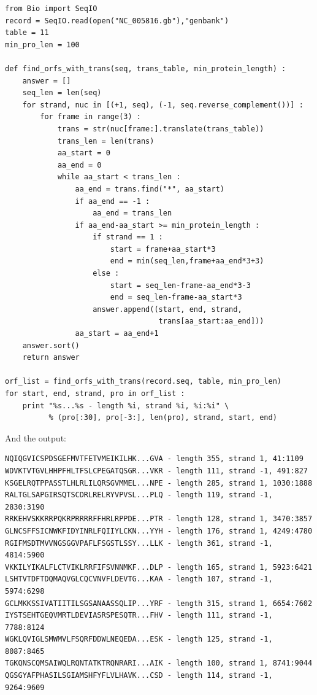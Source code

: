 \documentclass{report}
\begin{document}
\begin{verbatim}
from Bio import SeqIO 
record = SeqIO.read(open("NC_005816.gb"),"genbank")
table = 11
min_pro_len = 100

def find_orfs_with_trans(seq, trans_table, min_protein_length) :
    answer = []
    seq_len = len(seq)
    for strand, nuc in [(+1, seq), (-1, seq.reverse_complement())] :
        for frame in range(3) :
            trans = str(nuc[frame:].translate(trans_table))
            trans_len = len(trans)
            aa_start = 0
            aa_end = 0
            while aa_start < trans_len :
                aa_end = trans.find("*", aa_start)
                if aa_end == -1 :
                    aa_end = trans_len
                if aa_end-aa_start >= min_protein_length :
                    if strand == 1 :
                        start = frame+aa_start*3
                        end = min(seq_len,frame+aa_end*3+3)
                    else :
                        start = seq_len-frame-aa_end*3-3
                        end = seq_len-frame-aa_start*3                        
                    answer.append((start, end, strand,
                                   trans[aa_start:aa_end]))
                aa_start = aa_end+1
    answer.sort()
    return answer

orf_list = find_orfs_with_trans(record.seq, table, min_pro_len)
for start, end, strand, pro in orf_list :
    print "%s...%s - length %i, strand %i, %i:%i" \
          % (pro[:30], pro[-3:], len(pro), strand, start, end)
\end{verbatim}

\noindent And the output:

\begin{verbatim}
NQIQGVICSPDSGEFMVTFETVMEIKILHK...GVA - length 355, strand 1, 41:1109
WDVKTVTGVLHHPFHLTFSLCPEGATQSGR...VKR - length 111, strand -1, 491:827
KSGELRQTPPASSTLHLRLILQRSGVMMEL...NPE - length 285, strand 1, 1030:1888
RALTGLSAPGIRSQTSCDRLRELRYVPVSL...PLQ - length 119, strand -1, 2830:3190
RRKEHVSKKRRPQKRPRRRRFFHRLRPPDE...PTR - length 128, strand 1, 3470:3857
GLNCSFFSICNWKFIDYINRLFQIIYLCKN...YYH - length 176, strand 1, 4249:4780
RGIFMSDTMVVNGSGGVPAFLFSGSTLSSY...LLK - length 361, strand -1, 4814:5900
VKKILYIKALFLCTVIKLRRFIFSVNNMKF...DLP - length 165, strand 1, 5923:6421
LSHTVTDFTDQMAQVGLCQCVNVFLDEVTG...KAA - length 107, strand -1, 5974:6298
GCLMKKSSIVATIITILSGSANAASSQLIP...YRF - length 315, strand 1, 6654:7602
IYSTSEHTGEQVMRTLDEVIASRSPESQTR...FHV - length 111, strand -1, 7788:8124
WGKLQVIGLSMWMVLFSQRFDDWLNEQEDA...ESK - length 125, strand -1, 8087:8465
TGKQNSCQMSAIWQLRQNTATKTRQNRARI...AIK - length 100, strand 1, 8741:9044
QGSGYAFPHASILSGIAMSHFYFLVLHAVK...CSD - length 114, strand -1, 9264:9609
\end{verbatim}
\end{document}
